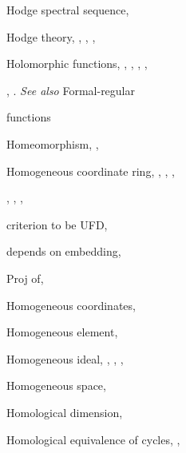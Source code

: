 {{\noindent\hspace*{0.0bp}Hodge spectral sequence, \par
\noindent\hspace*{0.0bp}Hodge theory, , , , \par
\noindent\hspace*{0.0bp}Holomorphic functions, , , , ,\par
\noindent\hspace*{15.0bp}, . \emph{See also} Formal-regular\par
\noindent\hspace*{15.0bp}functions\par
\noindent\hspace*{0.0bp}Homeomorphism, , \par
\noindent\hspace*{0.0bp}Homogeneous coordinate ring, , , ,\par
\noindent\hspace*{15.0bp}, , , \par
\noindent\hspace*{7.5bp}criterion to be UFD, \par
\noindent\hspace*{7.5bp}depends on embedding, \par
\noindent\hspace*{7.5bp}Proj of, \par
\noindent\hspace*{0.0bp}Homogeneous coordinates, \par
\noindent\hspace*{0.0bp}Homogeneous element, \par
\noindent\hspace*{0.0bp}Homogeneous ideal, , , , \par
\noindent\hspace*{0.0bp}Homogeneous space, \par
\noindent\hspace*{0.0bp}Homological dimension, \par
\noindent\hspace*{0.0bp}Homological equivalence of cycles, , \par
}}
